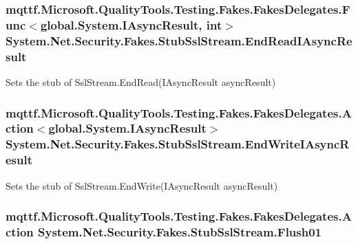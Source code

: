 \hypertarget{class_system_1_1_net_1_1_security_1_1_fakes_1_1_stub_ssl_stream_a7d31bee3f66d6e49630e14015d50f30d}{
\subsubsection[{End\-Read\-I\-Async\-Result}]{\setlength{\rightskip}{0pt plus 5cm}mqttf.\-Microsoft.\-Quality\-Tools.\-Testing.\-Fakes.\-Fakes\-Delegates.\-Func$<$global.\-System.\-I\-Async\-Result, int$>$ System.\-Net.\-Security.\-Fakes.\-Stub\-Ssl\-Stream.\-End\-Read\-I\-Async\-Result}}\label{class_system_1_1_net_1_1_security_1_1_fakes_1_1_stub_ssl_stream_a7d31bee3f66d6e49630e14015d50f30d}


Sets the stub of Ssl\-Stream.\-End\-Read(\-I\-Async\-Result async\-Result)

\hypertarget{class_system_1_1_net_1_1_security_1_1_fakes_1_1_stub_ssl_stream_aab69be10dcf29d75a2c727837f6e589b}{
\subsubsection[{End\-Write\-I\-Async\-Result}]{\setlength{\rightskip}{0pt plus 5cm}mqttf.\-Microsoft.\-Quality\-Tools.\-Testing.\-Fakes.\-Fakes\-Delegates.\-Action$<$global.\-System.\-I\-Async\-Result$>$ System.\-Net.\-Security.\-Fakes.\-Stub\-Ssl\-Stream.\-End\-Write\-I\-Async\-Result}}\label{class_system_1_1_net_1_1_security_1_1_fakes_1_1_stub_ssl_stream_aab69be10dcf29d75a2c727837f6e589b}


Sets the stub of Ssl\-Stream.\-End\-Write(\-I\-Async\-Result async\-Result)

\hypertarget{class_system_1_1_net_1_1_security_1_1_fakes_1_1_stub_ssl_stream_adc47c3da205d7e2f128cd9e812fcdea8}{
\subsubsection[{Flush01}]{\setlength{\rightskip}{0pt plus 5cm}mqttf.\-Microsoft.\-Quality\-Tools.\-Testing.\-Fakes.\-Fakes\-Delegates.\-Action System.\-Net.\-Security.\-Fakes.\-Stub\-Ssl\-Stream.\-Flush01}}\label{class_system_1_1_net_1_1_security_1_1_fakes_1_1_stub_ssl_stream_adc47c3da205d7e2f128cd9e812fcdea8}


